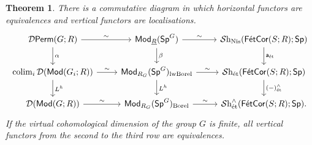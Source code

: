 \documentclass[reqno]{amsart}
\numberwithin{equation}{section}\theoremstyle{thms}
\newtheorem{thm}[equation]{Theorem}
\theoremstyle{defn}
\newcommand{\cD}{\mathcal{D}}
\newcommand{\tn}[1]{\textnormal{#1}}
\newcommand{\tsf}[1]{\textsf{\textup{#1}}}
\newcommand{\mcal}[1]{\mathcal{#1}}
\newcommand{\underl}[1]{\underline{#1}}
\newcommand{\sheaves}{\mcal{S}\tn{h}}
\newcommand{\Mod}{\tsf{Mod}}
\newcommand{\spec}{\tsf{Sp}}
\newcommand{\specg}{\tsf{Sp}^G}
\newcommand{\Perm}{\tsf{Perm}}
\newcommand{\corfets}[1]{\tsf{FétCor}(S;#1)}
\begin{document}
\begin{thm}\label{thm:bigdiagram}
There is a commutative diagram in which horizontal functors are equivalences and vertical functors are localisations.
\[\begin{tikzcd}
	{\cD\Perm(G;R)} & {\Mod_{\underl{R}}(\specg)} & {\sheaves_{\tn{Nis}}(\corfets{R};\spec)}  \\
	{\tn{colim}_i \, \cD(\Mod(G_i;R))} & {\Mod_{R_G}(\specg)_{\tn{lwBorel}}} & {\sheaves_{\tn{ét}}(\corfets{R};\spec)}  \\
	{\cD(\Mod(G;R))} & {\Mod_{R_G}(\specg)_{\tn{Borel}}} & {\sheaves_{\tn{ét}}^{\wedge}(\corfets{R};\spec).} 
	\arrow["\sim", from=1-1, to=1-2]
	\arrow["\alpha", from=1-1, to=2-1]
	\arrow["\sim", from=1-2, to=1-3]
	\arrow["\beta", from=1-2, to=2-2]
	\arrow["\tsf{a}_{\tn{ét}}", from=1-3, to=2-3]
	\arrow["\sim", from=2-1, to=2-2]
	\arrow["L^h", from=2-1, to=3-1]
	\arrow["\sim", from=2-2, to=2-3]
	\arrow["L^h", from=2-2, to=3-2]
	\arrow["(-)^{\wedge}_\tn{ét}", from=2-3, to=3-3]
	\arrow["\sim", from=3-1, to=3-2]
	\arrow["\sim", from=3-2, to=3-3]
\end{tikzcd}\]
If the virtual cohomological dimension of the group $G$ is finite, all vertical functors from the second to the third row are equivalences.
\end{thm}
\end{document}
